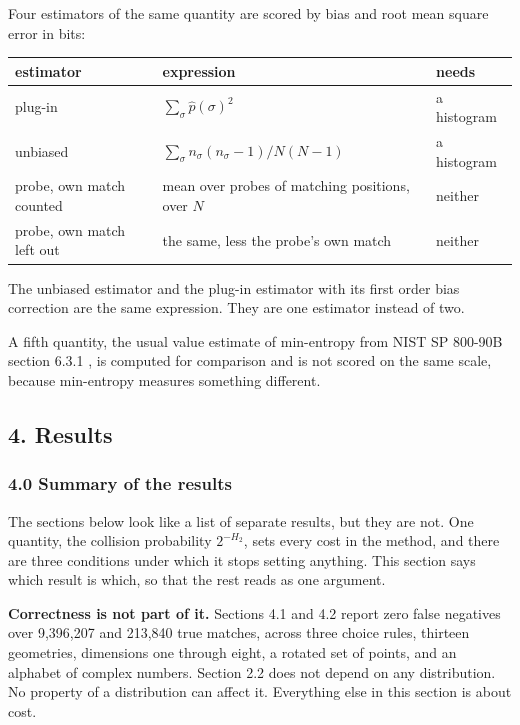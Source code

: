 Four estimators of the same quantity are scored by bias and root mean square error in bits:

\tiny
\setlength{\tabcolsep}{2pt}
\begin{longtable}{@{}>{\raggedright\arraybackslash}p{}>{\raggedright\arraybackslash}p{}>{\raggedright\arraybackslash}p{}@{}}
\toprule
estimator & expression & needs \\
\midrule
plug-in & \(\sum_\sigma \hat p(\sigma)^2\) & a histogram \\
unbiased & \(\sum_\sigma n_\sigma(n_\sigma-1) / N(N-1)\) & a histogram \\
probe, own match counted & mean over probes of matching positions, over \(N\) & neither \\
probe, own match left out & the same, less the probe's own match & neither \\
\bottomrule
\end{longtable}
\normalsize

The unbiased estimator and the plug-in estimator with its first order bias correction are the same expression. They are one estimator instead of two.

A fifth quantity, the usual value estimate of min-entropy from NIST SP 800-90B section 6.3.1 \cite{src:NIST-SP-800-90B}, is computed for comparison and is not scored on the same scale, because min-entropy measures something different.

\subsection{4. Results}

\subsubsection{4.0 Summary of the results}

The sections below look like a list of separate results, but they are not. One quantity, the collision probability \(2^{-H_2}\), sets every cost in the method, and there are three conditions under which it stops setting anything. This section says which result is which, so that the rest reads as one argument.

\noindent\textbf{Correctness is not part of it.} Sections 4.1 and 4.2 report zero false negatives over 9,396,207 and 213,840 true matches, across three choice rules, thirteen geometries, dimensions one through eight, a rotated set of points, and an alphabet of complex numbers. Section 2.2 does not depend on any distribution. No property of a distribution can affect it. Everything else in this section is about cost.

